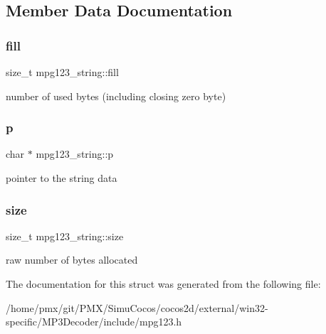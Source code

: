 \subsection{Member Data Documentation}
\mbox{\label{structmpg123__string_ab6a0704da4410a7e913fae5731284915}} 
\subsubsection{\texorpdfstring{fill}{fill}}
{\footnotesize\ttfamily size\+\_\+t mpg123\+\_\+string\+::fill}

number of used bytes (including closing zero byte) \mbox{\label{structmpg123__string_a0ecd4db99ad8bfa7a95d66db47678d7e}} 
\subsubsection{\texorpdfstring{p}{p}}
{\footnotesize\ttfamily char $\ast$ mpg123\+\_\+string\+::p}

pointer to the string data \mbox{\label{structmpg123__string_afa783be283e7e2f287f0b8a129701eba}} 
\subsubsection{\texorpdfstring{size}{size}}
{\footnotesize\ttfamily size\+\_\+t mpg123\+\_\+string\+::size}

raw number of bytes allocated 

The documentation for this struct was generated from the following file\+:\begin{DoxyCompactItemize}
\item 
/home/pmx/git/\+P\+M\+X/\+Simu\+Cocos/cocos2d/external/win32-\/specific/\+M\+P3\+Decoder/include/mpg123.\+h\end{DoxyCompactItemize}
